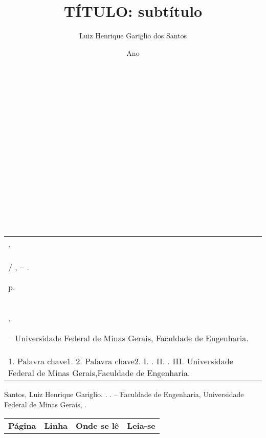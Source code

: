 \documentclass[12pt,a4paper,oneside]{abntex2}
\author{Luiz Henrique Gariglio dos Santos}
\title{TÍTULO: subtítulo}
\date{Ano}
\renewcommand{\imprimircapa}{
	\begin{capa}
		\center 
		{\normalsize \textbf{\imprimirinstituicao} }\\[5cm]
		{\normalsize\imprimirautor}\\[4cm]
		{\normalsize\textbf{\imprimirtitulo}}\\
		\vfill
		{\normalsize\imprimirlocal}\\
		{\normalsize\imprimirdata}\\
		
	\end{capa}
}
\newcommand{\folhaderostonova}{
	\center 
	{\normalsize \imprimirautor } \\[5cm]
	{\normalsize \textbf{\imprimirtitulo}} \\[4.5cm]
	\hspace{.45 \textwidth} %
	\begin{minipage}{.5\textwidth}
		\imprimirpreambulo \\ \\
		\imprimirorientadorRotulo \imprimirorientador \\ \\
		\imprimircoorientadorRotulo \imprimircoorientador
	\end{minipage}
	\center
	\vfill
	{\normalsize \imprimirlocal } \\
	{\normalsize \imprimirdata}
}
\begin{document}
	\imprimircapa
	\folhaderostonova
	\newpage
	\begin{fichacatalografica}
		\vspace*{\fill}
		\begin{table}[h]
			\footnotesize %
			\begin{tabular}{|p{12.5cm}|}
				\hline
				\imprimirautor.\\
				
				\hspace{0.5cm} \imprimirtitulo / \imprimirautor, -- \imprimirdata.
				
				\hspace{0.5cm} \pageref{LastPage} p. \\
				
				\hspace{0.5cm} \imprimirorientadorRotulo \imprimirorientador.
				
				\hspace{0.5cm} \imprimirtipotrabalho -- Universidade Federal de Minas Gerais, Faculdade de Engenharia.\\
				
				\hspace{0.5cm}
				1. Palavra chave1.
				2. Palavra chave2.
				I. \imprimirtitulo.
				II. \imprimirorientador.
				III. Universidade Federal de Minas Gerais,Faculdade de Engenharia. \\
				\hline
			\end{tabular}
		\end{table}
		
	\end{fichacatalografica}
	
	\begin{errata}
		\flushleftright
		Santos, Luiz Henrique Gariglio. \textbf{\imprimirtitulo}. \imprimirdata. \imprimirtipotrabalho -- Faculdade de Engenharia, Universidade Federal de Minas Gerais, \imprimirlocal.
		
		\begin{table}[htb]
			\center
			\footnotesize
			\begin{tabular}{p{1.4cm}p{1cm}p{3cm}p{3cm}}
				\textbf{Página} & \textbf{Linha} & \textbf{Onde se lê}  & \textbf{Leia-se}
			\end{tabular}
		\end{table}
	\end{errata}
	
\end{document}
